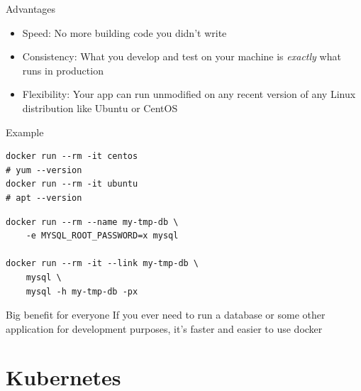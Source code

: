 \documentclass[xcolor=svgnames,17pt]{beamer}
\newcommand*{\sizefont}[1]{%
    \ifcase#1\relax
    \or \tiny
    \or \scriptsize
    \or \footnotesize
    \or \small
    \or \normalsize
    \or \large
    \or \Large
    \or \LARGE
    \or \huge
    \or \Huge
    \fi}
\begin{document}
\begin{frame}{Advantages}
\begin{itemize}
\item Speed: No more building code you didn’t write
\pause
\item Consistency: What you develop and test on your machine is
\textit{exactly} what runs in production
\pause
\item Flexibility: Your app can run unmodified on any recent version of any
Linux distribution like Ubuntu or CentOS
\end{itemize}
\end{frame}

\begin{frame}[fragile]{Example}

\begin{verbatim}
docker run --rm -it centos
# yum --version
docker run --rm -it ubuntu
# apt --version
\end{verbatim}

\pause


\pause

\begin{verbatim}
docker run --rm --name my-tmp-db \
    -e MYSQL_ROOT_PASSWORD=x mysql

docker run --rm -it --link my-tmp-db \
    mysql \
    mysql -h my-tmp-db -px
\end{verbatim}

\end{frame}

\begin{frame}{Big benefit for everyone}
\sizefont{6}
If you ever need to run a database or some other application for
development purposes, it’s faster and easier to use docker
\end{frame}

\section{Kubernetes}

\begin{frame}
\tableofcontents[currentsection]
\end{frame}
\end{document}
